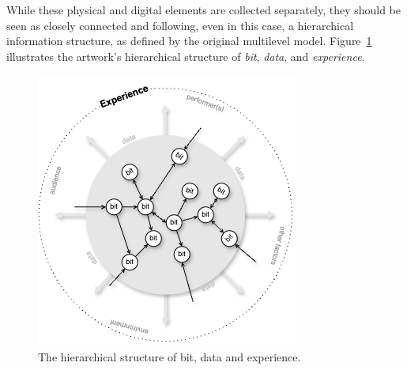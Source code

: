 While these physical and digital elements are collected separately, they should be seen as closely connected and following, even in this case, a hierarchical information structure, as defined by the original multilevel model. Figure~\ref{fig:c3-items} illustrates the artwork's hierarchical structure of \textit{bit}, \textit{data}, and \textit{experience}. 

\begin{figure}[!h]
    \centering
    \includegraphics[width=0.7\linewidth]{chapters/3-mdc_model-reactivation_workflow-instruction_template/image/graph03-items.png}
    \caption{The hierarchical structure of bit, data and experience.}
    \label{fig:c3-items}
\end{figure} 

